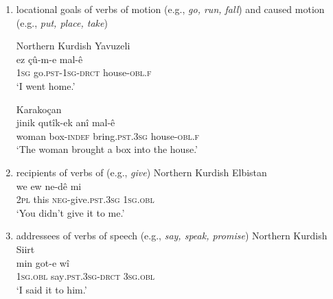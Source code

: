 \documentclass[output=paper,colorlinks,citecolor=brown]{langscibook}
\begin{document}
\begin{enumerate}[label=\alph*)]
\item locational goals of verbs of motion (e.g., \textit{go, run, fall}) and caused motion (e.g., \textit{put, place, take})

\ea\label{Bilingual:ex:1}
Northern Kurdish Yavuzeli \citep[K002]{matras2016dialects} \\
\gll ez çû-m-e mal-ê \\
\textsc{1sg} go\textsc{.pst-1sg-drct} house\textsc{-obl.f} \\
\glt `I went home.'
\z

\ea\label{Bilingual:ex:2} 
Karakoçan \citep[K075]{matras2016dialects} \\
\gll jinik qutîk-ek anî mal-ê \\
woman box\textsc{-indef} bring\textsc{.pst.3sg} house\textsc{-obl.f} \\
\glt `The woman brought a box into the house.' 
\z

\item recipients of verbs of  (e.g., \textit{give})
\ea\label{Bilingual:ex:3}
Northern Kurdish Elbistan \citep[K022]{matras2016dialects} \\
\gll we ew ne-dê mi \\
\textsc{2pl} this \textsc{neg}-give\textsc{.pst.3sg} \textsc{1sg.obl} \\
\glt `You didn't give it to me.'
\z

\item addressees of verbs of speech (e.g., \textit{say, speak, promise})
\ea\label{Bilingual:ex:4} 
Northern Kurdish Siirt \citep[K008]{matras2016dialects} \\
\gll min got-e wî \\
\textsc{1sg.obl} say\textsc{.pst.3sg-drct} \textsc{3sg.obl} \\
\glt `I said it to him.'
\z

\end{enumerate}
\end{document}
